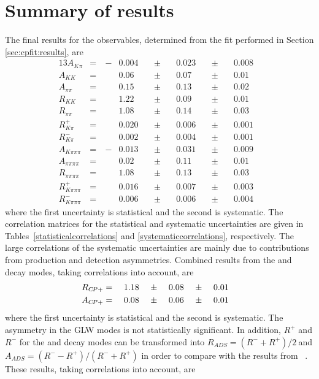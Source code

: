 \section{Summary of results}
\label{sec:cpfit:summary}

The final results for the \CP observables, determined from the \CP fit performed in Section \ref{sec:cpfit:results}, are  
\begin{alignat*}{13}
A_{K\pi} &= &\ -&0.004&\ &\pm&\ &0.023&\ &\pm&\ &0.008& \\
A_{KK} &= &&0.06&\ &\pm&\ &0.07&\ &\pm&\ &0.01& \\
A_{\pi\pi} &= &&0.15&\ &\pm&\ &0.13&\ &\pm&\ &0.02& \\
R_{KK} &= &&1.22&\ &\pm&\ &0.09&\ &\pm&\ &0.01& \\
R_{\pi\pi} &= &&1.08&\ &\pm&\ &0.14&\ &\pm&\ &0.03& \\
R^+_{K\pi} &= &&0.020&\ &\pm&\ &0.006&\ &\pm&\ &0.001& \\ 
R^-_{K\pi} &= &&0.002&\ &\pm&\ &0.004&\ &\pm&\ &0.001& \\
A_{K\pi\pi\pi} &= &\ -&0.013&\ &\pm&\ &0.031&\ &\pm&\ &0.009& \\
A_{\pi\pi\pi\pi} &= &&0.02&\ &\pm&\ &0.11&\ &\pm&\ &0.01& \\
R_{\pi\pi\pi\pi} &= &&1.08&\ &\pm&\ &0.13&\ &\pm&\ &0.03& \\
R^+_{K\pi\pi\pi} &= &&0.016&\ &\pm&\ &0.007&\ &\pm&\ &0.003& \\ 
R^-_{K\pi\pi\pi} &= &&0.006&\ &\pm&\ &0.006&\ &\pm&\ &0.004&
\end{alignat*}
where the first uncertainty is statistical and the second is systematic. The correlation matrices for the statistical and systematic uncertainties are given in Tables~\ref{statisticalcorrelations} and \ref{systematiccorrelations}, respectively. The large correlations of the systematic uncertainties are mainly due to contributions from production and detection asymmetries. Combined results from the \Kp\Km and \pip\pim decay modes, taking correlations into account, are
\begin{alignat*}{13}
R_{\CP+} &= &\ &1.18&\ &\pm&\ &0.08&\ &\pm&\ &0.01& \\
A_{\CP+} &= &\ &0.08&\ &\pm&\ &0.06&\ &\pm&\ &0.01&
\end{alignat*}
where the first uncertainty is statistical and the second is systematic. The asymmetry in the GLW modes is not statistically significant. In addition, $R^+$ and $R^-$ for the \Kp\pim and \Kp\pim\pip\pim decay modes can be transformed into $R_{ADS} = \left(R^- + R^+\right)/2\ $and \mbox{$A_{ADS} = \left(R^- - R^+\right)/\left(R^- + R^+\right)$} in order to compare with the results from \babar~\cite{BaBarDKstar}. These results, taking correlations into account, are
